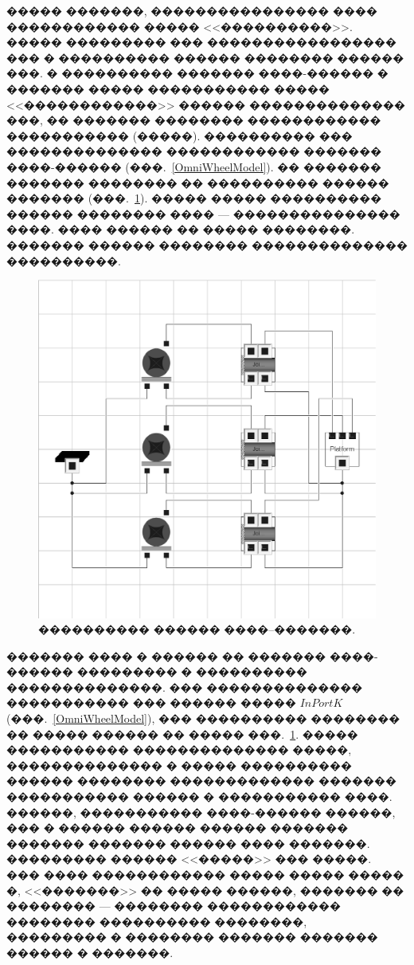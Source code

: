 \documentclass[12pt,a4paper]{article}
\begin{document}
����� �������, ���������������� ���� ������������ ����� <<����������>>. ����� 
��������� ��� ����������������� ��� � ���������� ������ �������� ������ ���. �
���������� ������� ����-������ � ������� ����� ����������� ����� 
<<������������>> ������ �������������� ���, �� ������� �������� ������������ 
����������� (�����). ���������� ��� �������������� ������������ ������� 
����-������ (���.~\ref{OmniWheelModel}). �� ������� ������� �������� �� 
���������� ������ ������� (���.~\ref{OmniVehicle}). ����� ����� ���������� 
������ �������� ���� --- ��������������� ����. ���� ������ �� ����� ��������.
������� ������ �������� �������������� ����������.

\begin{figure}[htb]
\centering\includegraphics[width=15cm]{OmniVehicleModel.eps}
\caption{���������� ������ ����--�������.}
\label{OmniVehicle}
\end{figure}

������� ���� � ������ �� ������� ����-������ ��������� � ���������� 
��������������. ��� �������������� ����������� ��� ������ ����� $InPortK$
(���.~\ref{OmniWheelModel}), ��� ���������� �������� �� ����� ������ �� �����
���.~\ref{OmniVehicle}. ����� ����������� �������������� �����, �������������� 
� ����� ���������� ������ �������� ������������� ������� ����������� ������ �
����������� ����. ������, ����������� ����-������ ������, ��� � ������ ������ 
������ ������� ������� ������� ������ ���� �������. ��������� ������ <<�����>>
��� �����. ��� ���� ������������ ����� ����� ����� �, <<�������>> �� �����
������, ������� �� �������� --- �������� ������������ �������� ���������� 
��������, ��������� � �������� ������� ������� ������ � �������.
\end{document}
